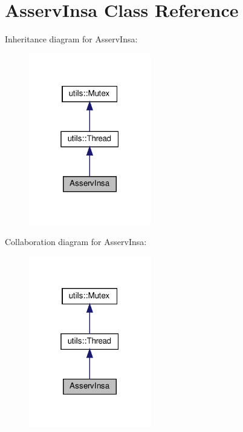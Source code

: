 \hypertarget{classAsservInsa}{}\section{Asserv\+Insa Class Reference}
\label{classAsservInsa}


Inheritance diagram for Asserv\+Insa\+:
\nopagebreak
\begin{figure}[H]
\begin{center}
\leavevmode
\includegraphics[width=151pt]{classAsservInsa__inherit__graph}
\end{center}
\end{figure}


Collaboration diagram for Asserv\+Insa\+:
\nopagebreak
\begin{figure}[H]
\begin{center}
\leavevmode
\includegraphics[width=151pt]{classAsservInsa__coll__graph}
\end{center}
\end{figure}
